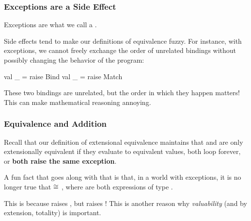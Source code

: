 \documentclass[aspectratio=169]{beamer}
\begin{document}
\begin{frame}[fragile]
  \frametitle{Exceptions are a Side Effect}

  Exceptions are what we call a .

  \pause
  \vspace{\fill}


  \pause
  \vspace{\fill}

  Side effects tend to make our definitions of equivalence fuzzy. For instance,
  with exceptions, we cannot freely exchange the order of unrelated
   bindings without possibly changing the behavior of the program:  
  \begin{codeblock}
    val _ = raise Bind 
    val _ = raise Match 
  \end{codeblock} 
  These two bindings are unrelated, but the order in which they happen 
  matters! This can make mathematical reasoning annoying.

\end{frame}

\begin{frame}[fragile]
  \frametitle{Equivalence and Addition}

  \ptsnmtmt

  Recall that our definition of extensional equivalence maintains that 
  and  are only extensionally equivalent if they evaluate to equivalent
  values, both loop forever, or \textbf{both raise the same exception}.

  \pause
  \vspace{\fill}

  A fun fact that goes along with that is that, in a world with exceptions, it is
  no longer true that  $\cong$ , where  are 
  both expressions of type .

  \pause
  \vspace{\fill}
  
  This is because  raises , but 
   raises ! This is another reason
  why \textit{valuability} (and by extension, totality) is important.
\end{frame}
\end{document}
